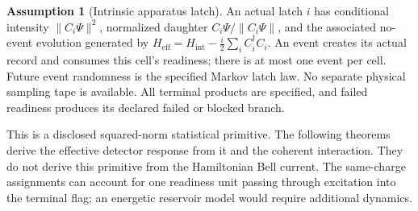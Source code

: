 \documentclass[11pt,oneside,openany]{book}
\theoremstyle{definition}
\newtheorem{assumption}[theorem]{Assumption}
\theoremstyle{remark}\newtheorem{remark}[theorem]{Remark}
\begin{document}
\begin{assumption}[Intrinsic apparatus latch]\label{det:latch-postulate}
An actual latch $i$ has conditional intensity $\|C_i\Psi\|^2$,
normalized daughter $C_i\Psi/\|C_i\Psi\|$, and the associated
no-event evolution generated by
$H_{\mathrm{eff}}=H_{\mathrm{int}}-\tfrac i2\sum_iC_i^\dagger C_i$.
An event creates its actual record and consumes this cell's readiness;
there is at most one event per cell. Future event randomness is the
specified Markov latch law. No separate physical sampling tape is
available. All terminal products are specified, and failed readiness
produces its declared failed or blocked branch.
\end{assumption}

This is a disclosed squared-norm statistical primitive. The following
theorems derive the effective detector response from it and the
coherent interaction. They do not derive this primitive from the
Hamiltonian Bell current. The same-charge assignments can account for
one readiness unit passing through excitation into the terminal flag;
an energetic reservoir model would require additional dynamics.
\end{document}
